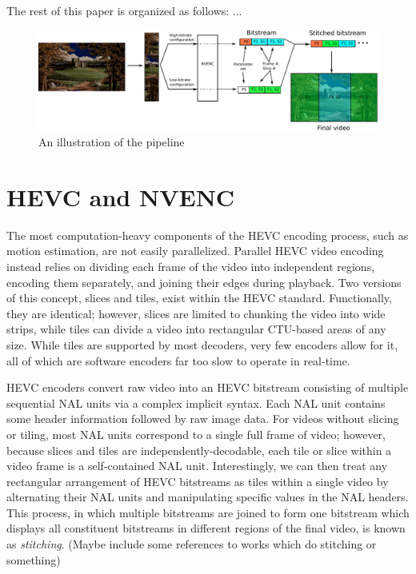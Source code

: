 The rest of this paper is organized as follows: ...


\begin{figure}[t]
	\centering
	\includegraphics[width=\textwidth]{figures/pipeline.pdf}
	\caption{An illustration of the pipeline}
\end{figure}

\section{HEVC and NVENC}

The most computation-heavy components of the HEVC encoding process, such as motion estimation, are not easily parallelized. Parallel HEVC video encoding instead relies on dividing each frame of the video into independent regions, encoding them separately, and joining their edges during playback. Two versions of this concept, slices and tiles, exist within the HEVC standard. Functionally, they are identical; however, slices are limited to chunking the video into wide strips, while tiles can divide a video into rectangular CTU-based areas of any size. While tiles are supported by most decoders, very few encoders allow for it, all of which are software encoders far too slow to operate in real-time. 

HEVC encoders convert raw video into an HEVC bitstream consisting of multiple sequential NAL units via a complex implicit syntax. Each NAL unit contains some header information followed by raw image data. For videos without slicing or tiling, most NAL units correspond to a single full frame of video; however, because slices and tiles are independently-decodable, each tile or slice within a video frame is a self-contained NAL unit. Interestingly, we can then treat any rectangular arrangement of HEVC bitstreams as tiles within a single video by alternating their NAL units and manipulating specific values in the NAL headers. This process, in which multiple bitstreams are joined to form one bitstream which displays all constituent bitstreams in different regions of the final video, is known as \textit{stitching}. (Maybe include some references to works which do stitching or something)

